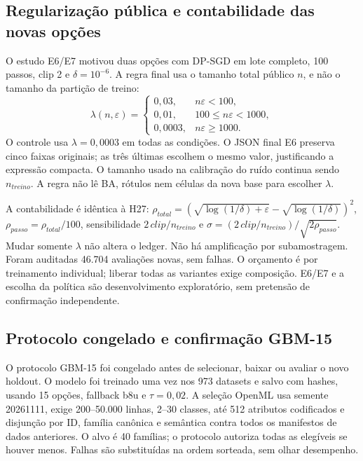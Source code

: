 \subsection{Regularização pública e contabilidade das novas opções}
\label{sec:desenvolvimento-GBM-13}

O estudo E6/E7 motivou duas opções com DP-SGD em lote completo, 100 passos, clip 2 e $\delta=10^{-6}$. A regra final usa o tamanho total público $n$, e não o tamanho da partição de treino:
\[
\lambda(n,\varepsilon)=\begin{cases}
0{,}03,& n\varepsilon<100,\\
0{,}01,&100\leq n\varepsilon<1000,\\
0{,}0003,&n\varepsilon\geq1000.
\end{cases}
\]
O controle usa $\lambda=0{,}0003$ em todas as condições. O JSON final E6 preserva cinco faixas originais; as três últimas escolhem o mesmo valor, justificando a expressão compacta. O tamanho usado na calibração do ruído continua sendo $n_{treino}$. A regra não lê BA, rótulos nem células da nova base para escolher $\lambda$.

A contabilidade é idêntica à H27: $\rho_{total}=(\sqrt{\log(1/\delta)+\varepsilon}-\sqrt{\log(1/\delta)})^2$, $\rho_{passo}=\rho_{total}/100$, sensibilidade $2\,clip/n_{treino}$ e $\sigma=(2\,clip/n_{treino})/\sqrt{2\rho_{passo}}$. Mudar somente $\lambda$ não altera o ledger. Não há amplificação por subamostragem. Foram auditadas 46.704 avaliações novas, sem falhas. O orçamento é por treinamento individual; liberar todas as variantes exige composição. E6/E7 e a escolha da política são desenvolvimento exploratório, sem pretensão de confirmação independente.

\subsection{Protocolo congelado e confirmação GBM-15}
\label{sec:protocolo-confirmatorio}

O protocolo GBM-15 foi congelado antes de selecionar, baixar ou avaliar o novo holdout. O modelo foi treinado uma vez nos 973 datasets e salvo com hashes, usando 15 opções, fallback b8u e $\tau=0{,}02$. A seleção OpenML usa semente 20261111, exige 200--50.000 linhas, 2--30 classes, até 512 atributos codificados e disjunção por ID, família canônica e semântica contra todos os manifestos de dados anteriores. O alvo é 40 famílias; o protocolo autoriza todas as elegíveis se houver menos. Falhas são substituídas na ordem sorteada, sem olhar desempenho.

